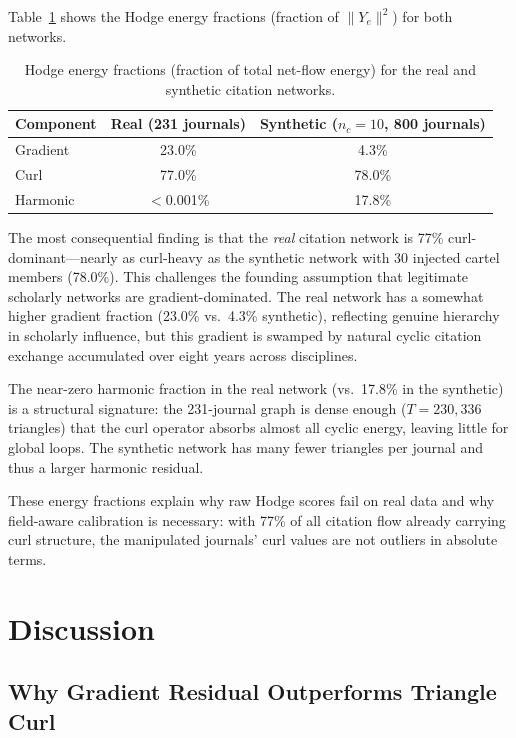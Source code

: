 \documentclass[twocolumn,11pt,letterpaper]{article}
\begin{document}
Table~\ref{tab:energy} shows the Hodge energy fractions (fraction of
$\|Y_e\|^2$) for both networks.

\begin{table}[!t]
  \centering
  \caption{Hodge energy fractions (fraction of total net-flow energy) for the
    real and synthetic citation networks.}
  \label{tab:energy}
  \begin{tabular}{lcc}
    \toprule
    Component & Real (231 journals) & Synthetic ($n_c=10$, 800 journals) \\
    \midrule
    Gradient  & 23.0\%      & 4.3\%  \\
    Curl      & 77.0\%      & 78.0\% \\
    Harmonic  & $<$0.001\%  & 17.8\% \\
    \bottomrule
  \end{tabular}
\end{table}

The most consequential finding is that the \emph{real} citation network is
77\% curl-dominant---nearly as curl-heavy as the synthetic network with 30
injected cartel members (78.0\%). This challenges the founding assumption that
legitimate scholarly networks are gradient-dominated. The real network has a
somewhat higher gradient fraction (23.0\% vs.\ 4.3\% synthetic), reflecting
genuine hierarchy in scholarly influence, but this gradient is swamped by
natural cyclic citation exchange accumulated over eight years across
disciplines.

The near-zero harmonic fraction in the real network (vs.\ 17.8\% in the
synthetic) is a structural signature: the 231-journal graph is dense enough
($T = 230{,}336$ triangles) that the curl operator absorbs almost all cyclic
energy, leaving little for global loops. The synthetic network has many fewer
triangles per journal and thus a larger harmonic residual.

These energy fractions explain why raw Hodge scores fail on real data and why
field-aware calibration is necessary: with 77\% of all citation flow already
carrying curl structure, the manipulated journals' curl values are not outliers
in absolute terms.

\section{Discussion}
\label{sec:discussion}

\subsection{Why Gradient Residual Outperforms Triangle Curl}
\label{sec:gradient}
\end{document}
